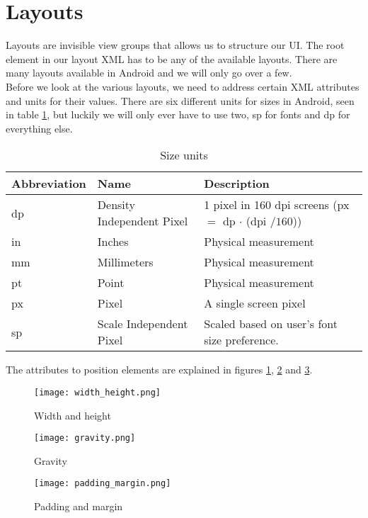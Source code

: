 \section{Layouts}
Layouts are invisible view groups that allows us to structure our UI. The root element in our layout XML has to be any of the available layouts. There are many layouts available in Android and we will only go over a few.\\

Before we look at the various layouts, we need to address certain XML attributes and units for their values. There are six different units for sizes in Android, seen in table \ref{table:units}, but luckily we will only ever have to use two, sp for fonts and dp for everything else.

\begin{table}[H]
\centering
\begin{tabular}{l|l|l}
Abbreviation & Name & Description \\ 
\hline
dp & Density Independent Pixel & 1 pixel in 160 dpi screens (px $=$ dp $\cdot$ (dpi $/ 160$)) \\
in & Inches & Physical measurement \\
mm & Millimeters & Physical measurement \\
pt & Point & Physical measurement \\
px & Pixel & A single screen pixel \\
sp & Scale Independent Pixel & Scaled based on user’s font size preference.
\end{tabular}
\caption{Size units}
\label{table:units}
\end{table}%

The attributes to position elements are explained in figures \ref{fig:wah}, \ref{fig:grav} and \ref{fig:pam}.

\begin{figure}[H]
\centering
\texttt{[image: width\_height.png]}
\caption{Width and height}
\label{fig:wah}
\end{figure}
\begin{figure}[H]
\centering
\texttt{[image: gravity.png]}
\caption{Gravity}
\label{fig:grav}
\end{figure}
\begin{figure}[H]
\centering
\texttt{[image: padding\_margin.png]}
\caption{Padding and margin}
\label{fig:pam}
\end{figure}



